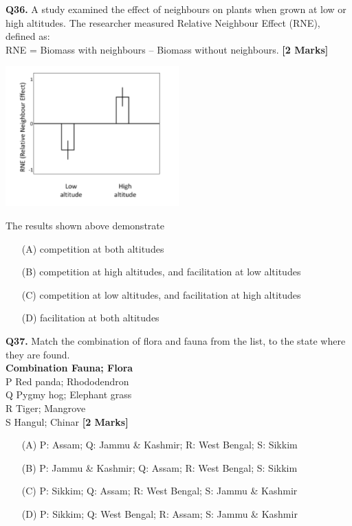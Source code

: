 \documentclass[11pt]{article}
\newcommand{\questionb}[2]{
    \noindent\textbf{Q#2.} #1 \hfill \textbf{[2 Marks]}
}
\begin{document}
\questionb{A study examined the effect of neighbours on plants when grown at low or high altitudes. The researcher measured Relative Neighbour Effect (RNE), defined as: \\ 
RNE = Biomass with neighbours – Biomass without neighbours.}{36}
\begin{center}
\includegraphics[width=0.5\textwidth]{figures/36}
\end{center}
The results shown above demonstrate
\begin{enumerate}
    \item[(A)] competition at both altitudes
    \item[(B)] competition at high altitudes, and facilitation at low altitudes
    \item[(C)] competition at low altitudes, and facilitation at high altitudes
    \item[(D)] facilitation at both altitudes
\end{enumerate}
\vspace{0.5cm}

\questionb{Match the combination of flora and fauna from the list, to the state where they are found.\\
\textbf{Combination \hspace{1cm} Fauna; Flora}\\
P \hspace{1cm} Red panda; Rhododendron\\
Q \hspace{1cm} Pygmy hog; Elephant grass\\
R \hspace{1cm} Tiger; Mangrove\\
S \hspace{1cm} Hangul; Chinar}{37}
\begin{enumerate}
    \item[(A)] P: Assam; Q: Jammu \& Kashmir; R: West Bengal; S: Sikkim
    \item[(B)] P: Jammu \& Kashmir; Q: Assam; R: West Bengal; S: Sikkim
    \item[(C)] P: Sikkim; Q: Assam; R: West Bengal; S: Jammu \& Kashmir
    \item[(D)] P: Sikkim; Q: West Bengal; R: Assam; S: Jammu \& Kashmir
\end{enumerate}
\vspace{0.5cm}
\end{document}
